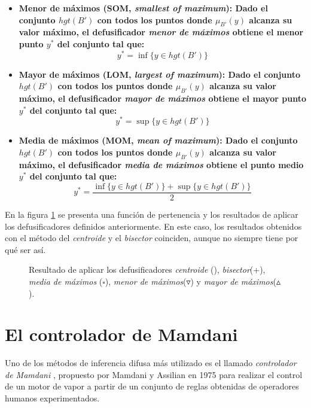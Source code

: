 \begin{itemize}
\begin{equation}
  \end{equation}
  \item\bfseries Menor de máximos (SOM, \emph{smallest of maximum}): \normalfont Dado el conjunto $hgt(B')$ con todos los puntos donde $\mu_{B'}(y)$ alcanza su valor máximo, el defusificador \emph{menor de máximos} obtiene el menor punto $y^*$ del conjunto tal que:
  \begin{equation}
	y^* = \inf\{y \in hgt(B')\}
  \end{equation}
  \item\bfseries Mayor de máximos (LOM, \emph{largest of maximum}): \normalfont Dado el conjunto $hgt(B')$ con todos los puntos donde $\mu_{B'}(y)$ alcanza su valor máximo, el defusificador \emph{mayor de máximos} obtiene el mayor punto $y^*$ del conjunto tal que:
   \begin{equation}
  	y^* = \sup\{y \in hgt(B')\}
    \end{equation}
   \item\bfseries Media de máximos (MOM, \emph{mean of maximum}): \normalfont Dado el conjunto $hgt(B')$ con todos los puntos donde $\mu_{B'}(y)$ alcanza su valor máximo, el defusificador \emph{media de máximos} obtiene el punto medio $y^*$ del conjunto tal que:
   \begin{equation}
     	y^* = \frac{ \inf\{y \in hgt(B')\} + \sup\{y \in hgt(B')\}}{2}
   \end{equation}
\end{itemize}
En la figura \ref{fig:defuzzifiers} se presenta una función de pertenencia y los resultados de aplicar los defusificadores definidos anteriormente. En este caso, los resultados obtenidos con el método del \emph{centroide} y el \emph{bisector} coinciden, aunque no siempre tiene por qué ser así.
\begin{figure}[t]
	\centering
	\setlength\figureheight{5.5cm}
	\setlength\figurewidth{12cm}
	
	\caption{Resultado de aplicar los defusificadores \emph{centroide} (\textasteriskcentered), \emph{bisector}(+), \emph{media de máximos} ($\square$), \emph{menor de máximos}($\triangledown$) y \emph{mayor de máximos}($\vartriangle$).}
	\label{fig:defuzzifiers}
\end{figure}

\section{El controlador de Mamdani}\label{sec:mamdani-controller}
Uno de los métodos de inferencia difusa más utilizado es el llamado \emph{controlador de Mamdani} \cite{Mamdani1975}, propuesto por Mamdani y Assilian en 1975 para realizar el control de un motor de vapor a partir de un conjunto de reglas obtenidas de operadores humanos experimentados.

